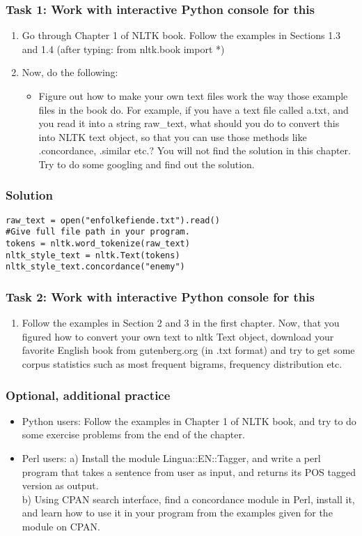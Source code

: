\documentclass{beamer}
\begin{document}
\begin{frame}
\frametitle{Task 1: Work with interactive Python console for this}
\begin{enumerate}
\item Go through Chapter 1 of NLTK book. Follow the examples in Sections 1.3 and 1.4 (after typing: from nltk.book import *)
\item Now, do the following:
\begin{itemize}
\item Figure out how to make your own text files work the way those example files in the book do. For example, if you have a text file called a.txt, and you read it into a string raw\_text, what should you do to convert this into NLTK text object, so that you can use those methods like .concordance, .similar etc.? You will not find the solution in this chapter. Try to do some googling and find out the solution.
\end{itemize}
\end{enumerate}
\end{frame}

\begin{frame}[fragile]
\frametitle{Solution}
\begin{verbatim}
raw_text = open("enfolkefiende.txt").read() 
#Give full file path in your program.
tokens = nltk.word_tokenize(raw_text) 
nltk_style_text = nltk.Text(tokens)
nltk_style_text.concordance("enemy")
\end{verbatim}
\end{frame}

\begin{frame}
\frametitle{Task 2: Work with interactive Python console for this}
\begin{enumerate}
\item Follow the examples in Section 2 and 3 in the first chapter. Now, that you figured how to convert your own text to nltk Text object, download your favorite English book from gutenberg.org (in .txt format) and try to get some corpus statistics such as most frequent bigrams, frequency distribution etc.
\end{enumerate}
\end{frame}

\begin{frame}
\frametitle{Optional, additional practice}
\begin{itemize}
\item Python users: Follow the examples in Chapter 1 of NLTK book, and try to do some exercise problems from the end of the chapter.
\item Perl users: a) Install the module Lingua::EN::Tagger, and write a perl program that takes a sentence from user as input, and returns its POS tagged version as output. \\ b) Using CPAN search interface, find a concordance module in Perl, install it, and learn how to use it in your program from the examples given for the module on CPAN.
\end{itemize}
\end{frame}
\end{document}

